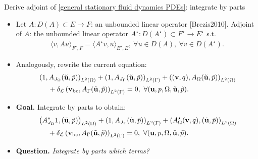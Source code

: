 \documentclass[10pt
hyperref={
    pdfauthor={Hong Quan Ba Nguyen},
    pdftitle={Optimal Shape Design of Air Ducts in Combustion Engines: Design a General Framework},
    pdfsubject={Talk},
    pdfcreator={LaTeX},
}
]{beamer}
\begin{document}
\begin{frame}{Derive adjoint of \eqref{general stationary fluid dynamics PDEs}: integrate by parts}
    \begin{itemize}
        \item Let $A:D(A)\subset E\to F$: an unbounded linear operator [Brezis2010]. Adjoint of $A$: the unbounded linear operator $A^\star:D(A^\star)\subset F^\star\to E^\star$ s.t.
        \begin{align*}
            \langle v,Au\rangle_{F^\star,F} = \langle A^\star v,u\rangle_{E^\star,E},\ \forall u\in D(A),\ \forall v\in D(A^\star).
        \end{align*}
        \item Analogously, rewrite the current equation:
        \begin{align*}
            &\left(1,A_{J_\Omega}(\tilde{\textbf{u}},\tilde{p})\right)_{L^2(\Omega)} + \left(1,A_{J_\Gamma}(\tilde{\textbf{u}},\tilde{p})\right)_{L^2(\Gamma)} + \left((\textbf{v},q), A_\Omega(\tilde{\textbf{u}},\tilde{p})\right)_{L^2(\Omega)}\\
            &\hspace{5mm}+ \delta_{\mathcal{L}}\left(\textbf{v}_{\rm bc},A_\Gamma(\tilde{\textbf{u}},\tilde{p})\right)_{L^2(\Gamma)} = 0,\ \forall(\textbf{u},p,\Omega,\tilde{\textbf{u}},\tilde{p}).
        \end{align*}
        \item \textbf{Goal.} Integrate by parts to obtain:
        \begin{align*}
            &\left(A_{J_\Omega}^\star 1,(\tilde{\textbf{u}},\tilde{p})\right)_{L^2(\Omega)} + \left(1,A_{J_\Gamma}(\tilde{\textbf{u}},\tilde{p})\right)_{L^2(\Gamma)} + \left(A_\Omega^\star(\textbf{v},q), (\tilde{\textbf{u}},\tilde{p})\right)_{L^2(\Omega)}\\
            &\hspace{5mm}+ \delta_{\mathcal{L}}\left(\textbf{v}_{\rm bc},A_\Gamma(\tilde{\textbf{u}},\tilde{p})\right)_{L^2(\Gamma)} = 0,\ \forall(\textbf{u},p,\Omega,\tilde{\textbf{u}},\tilde{p}).
        \end{align*}
    \item \textbf{Question.} \textit{Integrate by parts which terms?}
    \end{itemize}
\end{frame}
\end{document}
